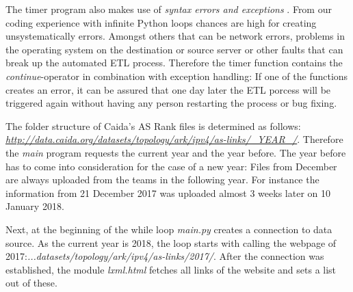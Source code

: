 \documentclass[conference, 11pt]{IEEEtran}
\begin{document}




The timer program also makes use of \textit{syntax errors and exceptions} \cite{PythonDocumentation}.
From our coding experience with infinite Python loops chances are high for creating unsystematically errors. Amongst others that can be network errors, problems in the operating system on the destination or source server or other faults that can break up the automated ETL process.
Therefore the timer function contains the \textit{continue}-operator in combination with exception handling: If one of the functions creates an error, it can be assured that one day later the ETL porcess will be triggered again without having any person restarting the process or bug fixing. \linebreak

\vspace{0.2cm}

\vspace{0.5cm}

The folder structure of Caida's AS Rank files is determined as follows: \textit{\url{http://data.caida.org/datasets/topology/ark/ipv4/as-links/_YEAR_/}}. Therefore the \textit{main} program requests the current year and the year before. The year before has to come into consideration for the case of a new year: Files from December are always uploaded from the teams in the following year. For instance the information from 21 December 2017 was uploaded almost 3 weeks later on 10 January 2018.

Next, at the beginning of the while loop \textit{main.py} creates a connection to data source. As the current year is 2018, the loop starts with calling the webpage of 2017:\textit{...datasets/topology/ark/ipv4/as-links/2017/}. After the connection was established, the module \textit{lxml.html} fetches all links of the website and sets a list out of these.



\end{document}
